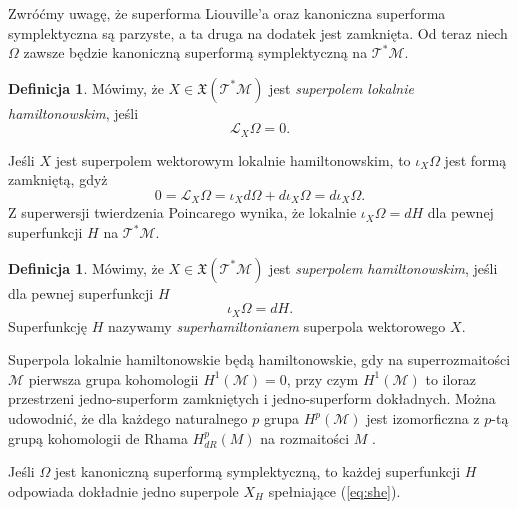 \documentclass[11pt,a4paper]{report}
\theoremstyle{definition}
\newtheorem{definition}[theorem]{Definicja}
\begin{document}
Zwróćmy uwagę, że superforma Liouville'a oraz kanoniczna superforma symplektyczna są parzyste, a ta druga na dodatek jest zamknięta. Od teraz niech $\Omega$ zawsze będzie kanoniczną superformą symplektyczną na $\mathcal{T^*M}$.
			      				
\begin{definition}
	Mówimy, że $X \in \mathfrak{X}(\mathcal{T^*M})$ jest \textit{superpolem lokalnie hamiltonowskim}, jeśli
	\begin{equation*}
		\mathcal{L}_X \Omega = 0.
	\end{equation*}
\end{definition}
Jeśli $X$ jest superpolem wektorowym lokalnie hamiltonowskim, to $\iota_X \Omega$ jest formą zamkniętą, gdyż
\begin{equation*}
	0 = \mathcal{L}_X \Omega = \iota_X d \Omega + d \iota_X \Omega = d \iota_X \Omega.
\end{equation*}
Z superwersji twierdzenia Poincarego \cite{bartocci} wynika, że lokalnie $\iota_X \Omega = dH$ dla pewnej superfunkcji $H$ na $\mathcal{T^*M}$.
			      				
\begin{definition}
	Mówimy, że $X \in \mathfrak{X}(\mathcal{T^*M})$ jest \textit{superpolem hamiltonowskim}, jeśli dla pewnej superfunkcji $H$
	\begin{equation}
		\label{eq:she}
		\iota_X \Omega = dH.
	\end{equation}
	Superfunkcję $H$ nazywamy \textit{superhamiltonianem} superpola wektorowego $X$.
\end{definition}
			      				
Superpola lokalnie hamiltonowskie będą hamiltonowskie, gdy na superrozmaitości $\mathcal{M}$ pierwsza grupa kohomologii $H^1(\mathcal{M}) = 0$, przy czym $H^1(\mathcal{M})$ to iloraz przestrzeni jedno-superform zamkniętych i jedno-superform dokładnych. Można udowodnić, że dla każdego naturalnego $p$ grupa $H^p(\mathcal{M})$ jest izomorficzna z $p$-tą grupą kohomologii de Rhama $H^p _{dR} (M)$ na rozmaitości $M$ \cite{bartocci,Ko77}.
			      				
Jeśli $\Omega$ jest kanoniczną superformą symplektyczną, to każdej superfunkcji $H$ odpowiada dokładnie jedno superpole $X_H$ spełniające (\ref{eq:she}).
			      				
\end{document}
